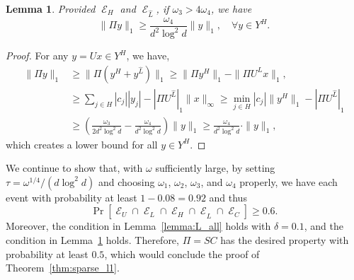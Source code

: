 \documentclass[11pt]{article}
\newtheorem{lemma}{Lemma}
\DeclareMathOperator{\E}{\mathcal{E}}
\begin{document}
\begin{lemma}
  \label{lemma:lower_H}
  Provided $\E_H$ and $\E_{\hat{L}}$, if $\omega_3 > 4
  \omega_4 $, we have
  \begin{equation*}
    \|\Pi y\|_1 \geq \frac{\omega_4}{d^2 \log^2 d} \|y\|_1, \quad \forall y \in Y^H.
  \end{equation*}
\end{lemma}
\begin{proof}
  For any $y = U x \in Y^H$, we have,
  \begin{align*}
    \|\Pi y\|_1 &\geq \|\Pi (y^{H} + y^{\hat{L}} )\|_1 \geq \|\Pi y^{H} \|_1 -
    \|\Pi U^{\hat{L}} x \|_1, \\
    &\geq \sum_{j \in H} |c_j| |y_j| - |\Pi U^{\hat{L}}|_1 \|x\|_\infty 
    \geq \min_{j \in H} |c_j| \|y^H\|_1 - |\Pi U^{\hat{L}}|_1 \\
    &\geq \left( \frac{\omega_3}{2 d^2 \log^2 d} - \frac{\omega_4}{d^2 \log^2 d} \right) \|y\|_1
    \geq \frac{\omega_4}{d^2 \log^2 d} \cdot \|y\|_1,
  \end{align*}
  which creates a lower bound for all $y \in Y^H$.
\end{proof}

We continue to show that, with $\omega$ sufficiently large, by setting $\tau =
\omega^{1/4} / ( d \log^2 d )$ and choosing $\omega_1$, $\omega_2$, $\omega_3$,
and $\omega_4$ properly, we have each event with probability at least $1-0.08 =
0.92$ and thus
\begin{equation*}
  \Pr[ \E_U \cap \E_L \cap \E_H 
  \cap \E_{\hat{L}} \cap \E_C ] \geq 0.6.
\end{equation*}
Moreover, the condition in Lemma~\ref{lemma:L_all} holds with $\delta = 0.1$,
and the condition in Lemma~\ref{lemma:lower_H} holds.
Therefore, $\Pi = S C$ has the desired property with probability at least $0.5$,
which would conclude the proof of Theorem~\ref{thm:sparse_l1}.
\end{document}
